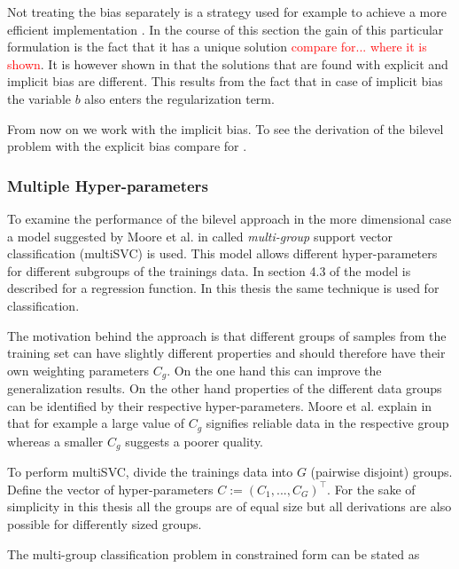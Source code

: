 Not treating the bias separately is a strategy used for example to achieve a more efficient implementation \cite[section 3.2, p. 22]{Gunn1998}. In the course of this section the gain of this particular formulation is the fact that it has a unique solution \textcolor{red}{compare for... where it is shown}.
It is however shown in \cite[section 3.2, p. 22]{Gunn1998} that the solutions that are found with explicit and implicit bias are different.
This results from the fact that in case of implicit bias the variable \(b\) also enters the regularization term.

From now on we work with the implicit bias. To see the derivation of the bilevel problem with the explicit bias compare for \cite[section 2.2]{Kunapuli2008}.

\subsubsection{Multiple Hyper-parameters}

To examine the performance of the bilevel approach in the more dimensional case a model suggested by Moore et al. in \cite{Moore2011} called \emph{multi-group} support vector classification (multiSVC) is used. This model allows different hyper-parameters for different subgroups of the trainings data.
In section 4.3 of \cite{Moore2011} the model is described for a regression function. In this thesis the same technique is used for classification.

The motivation behind the approach is that different groups of samples from the training set can have slightly different properties and should therefore have their own weighting parameters \(C_g\).
On the one hand this can improve the generalization results. On the other hand properties of the different data groups can be identified by their respective hyper-parameters. Moore et al. explain in \cite[section 4.3, p. 9]{Moore2011} that for example a large value of \(C_g\) signifies reliable data in the respective group whereas a smaller \(C_g\) suggests a poorer quality.

To perform multiSVC, divide the trainings data into \(G\) (pairwise disjoint) groups.
Define the vector of hyper-parameters \(C := (C_1,...,C_G)^{\top}\). For the sake of simplicity in this thesis all the groups are of equal size but all derivations are also possible for differently sized groups.

The multi-group classification problem in constrained form can be stated as 

